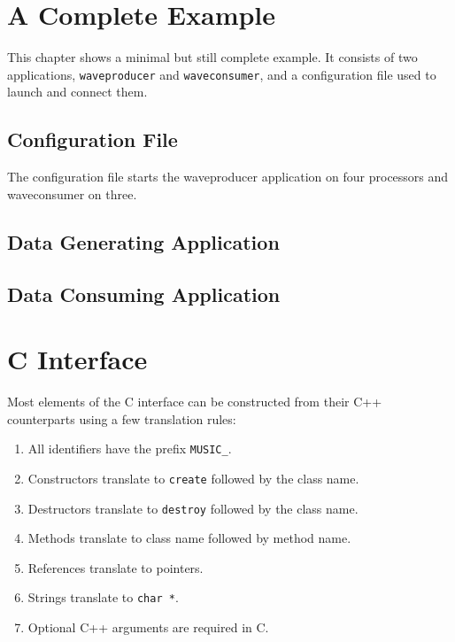 \documentclass[a4paper,twoside]{report}
\begin{document}
\chapter{A Complete Example}

This chapter shows a minimal but still complete example.  It consists
of two applications, \texttt{waveproducer} and \texttt{waveconsumer},
and a configuration file used to launch and connect them.


\section{Configuration File}
\label{sec:conffile}

The configuration file starts the waveproducer application on four
processors and waveconsumer on three.




\section{Data Generating Application}




\section{Data Consuming Application}




\chapter{C Interface}
\label{app:cint}

Most elements of the C interface can be constructed from their C++
counterparts using a few translation rules:

\begin{enumerate}
\item All identifiers have the prefix \lstinline|MUSIC_|.
\item Constructors translate to \lstinline|create| followed by the
  class name.
\item Destructors translate to \lstinline|destroy| followed by the
  class name.
\item Methods translate to class name followed by method name.
\item References translate to pointers.
\item Strings translate to \lstinline|char *|.
\item Optional C++ arguments are required in C.
\end{enumerate}
\end{document}
